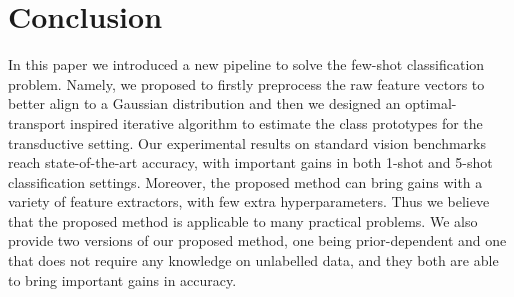 \documentclass[review]{elsarticle}
\begin{document}
\section{Conclusion}
\label{conclusion}

In this paper we introduced a new pipeline to solve the few-shot classification problem. Namely, we proposed to firstly preprocess the raw feature vectors to better align to a Gaussian distribution and then we designed an optimal-transport inspired iterative algorithm to estimate the class prototypes for the transductive setting. Our experimental results on standard vision benchmarks reach state-of-the-art accuracy, with important gains in both 1-shot and 5-shot classification settings. Moreover, the proposed method can bring gains with a variety of feature extractors, with few extra hyperparameters. Thus we believe that the proposed method is applicable to many practical problems. We also provide two versions of our proposed method, one being prior-dependent and one that does not require any knowledge on unlabelled data, and they both are able to bring important gains in accuracy.


\end{document}

